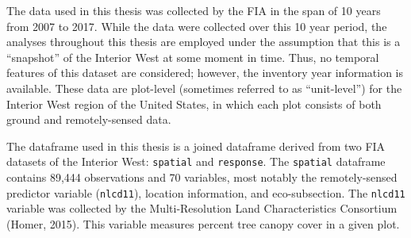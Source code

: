 \documentclass[12pt,twoside]{reedthesis}
\begin{document}
The data used in this thesis was collected by the FIA in the span of 10 years from 2007 to 2017. While the data were collected over this 10 year period, the analyses throughout this thesis are employed under the assumption that this is a ``snapshot'' of the Interior West at some moment in time. Thus, no temporal features of this dataset are considered; however, the inventory year information is available. These data are plot-level (sometimes referred to as ``unit-level'') for the Interior West region of the United States, in which each plot consists of both ground and remotely-sensed data.

The dataframe used in this thesis is a joined dataframe derived from two FIA datasets of the Interior West: \texttt{spatial} and \texttt{response}. The \texttt{spatial} dataframe contains 89,444 observations and 70 variables, most notably the remotely-sensed predictor variable (\texttt{nlcd11}), location information, and eco-subsection. The \texttt{nlcd11} variable was collected by the Multi-Resolution Land Characteristics Consortium (Homer, 2015). This variable measures percent tree canopy cover in a given plot.
\end{document}
